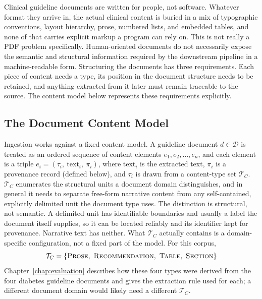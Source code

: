 Clinical guideline documents are written for people, not software. Whatever format they arrive in, the actual clinical content is buried in a mix of typographic conventions, layout hierarchy, prose, numbered lists, and embedded tables, and none of that carries explicit markup a program can rely on. This is not really a PDF problem specifically. Human-oriented documents do not necessarily expose the semantic and structural information required by the downstream pipeline in a machine-readable form. Structuring the documents has three requirements. Each piece of content
needs a type, its position in the document structure needs to be retained,
and anything extracted from it later must remain traceable to the source.
The content model below represents these requirements explicitly.

\subsection{The Document Content Model}
\label{sec:content-model}

Ingestion works against a fixed content model. A guideline document $d \in \mathcal{D}$ is treated as an ordered sequence of content elements $e_1, e_2, \ldots, e_n$, and each element is a triple $e_i = (\tau_i,\ \text{text}_i,\ \pi_i)$, where $\text{text}_i$ is the extracted text, $\pi_i$ is a provenance record (defined below), and $\tau_i$ is drawn from a content-type set $\mathcal{T}_C$. $\mathcal{T}_C$ enumerates the structural units a document domain 
distinguishes, and in general it needs to separate free-form narrative 
content from any self-contained, explicitly delimited unit the document 
type uses. The distinction is structural, not semantic. A delimited unit has 
identifiable boundaries and usually a label the document itself 
supplies, so it can be located reliably and its identifier kept for 
provenance. Narrative text has neither. What $\mathcal{T}_C$ actually contains is a domain-specific configuration, not a fixed part of the model. For this corpus,
$$\mathcal{T}_C = \{\textsc{Prose},\ \textsc{Recommendation},\ \textsc{Table},\ \textsc{Section}\}$$
Chapter~\ref{chap:evaluation} describes how these four types were derived from the four diabetes guideline documents and gives the extraction rule used for each; a different document domain would likely need a different $\mathcal{T}_C$.

